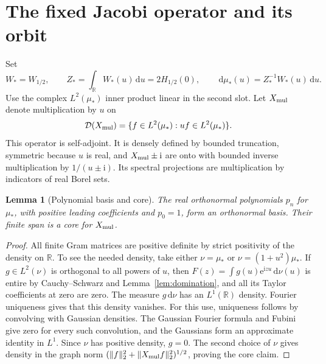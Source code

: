 \documentclass[11pt]{article}
\numberwithin{equation}{section}
\newtheorem{lemma}[theorem]{Lemma}
\newcommand{\R}{\mathbb R}
\newcommand{\ee}{\mathrm e}
\newcommand{\ii}{\mathrm i}
\newcommand{\dd}{\,\mathrm d}
\begin{document}
\section{The fixed Jacobi operator and its orbit}\label{sec:operator}

Set
\[
 W_*=W_{1/2},\qquad Z_*=\int_{\R}W_*(u)\dd u=2H_{1/2}(0),
 \qquad \dd\mu_*(u)=Z_*^{-1}W_*(u)\dd u.
\]
Use the complex \(L^2(\mu_*)\) inner product linear in the second
slot. Let \(X_{\rm mul}\) denote multiplication by \(u\) on
\[
 \mathcal D(X_{\rm mul})=\{f\in L^2(\mu_*):uf\in L^2(\mu_*)\}.
\]
This operator is self-adjoint. It is densely defined by bounded
truncation, symmetric because \(u\) is real, and
\(X_{\rm mul}\pm\ii\) are onto with bounded inverse multiplication by
\(1/(u\pm\ii)\). Its spectral projections are multiplication by
indicators of real Borel sets.

\begin{lemma}[Polynomial basis and core]\label{lem:core}
The real orthonormal polynomials \(p_n\) for \(\mu_*\), with positive
leading coefficients and \(p_0=1\), form an orthonormal basis. Their
finite span is a core for \(X_{\rm mul}\).
\end{lemma}
\begin{proof}
All finite Gram matrices are positive definite by strict positivity
of the density on \(\R\). To see the needed density, take either
\(\nu=\mu_*\) or \(\nu=(1+u^2)\mu_*\). If \(g\in L^2(\nu)\) is
orthogonal to all powers of \(u\), then
\(F(z)=\int g(u)\ee^{\ii zu}\dd\nu(u)\) is entire by
Cauchy--Schwarz and Lemma~\ref{lem:domination}, and all its Taylor
coefficients at zero are zero. The measure \(g\dd\nu\) has an
\(L^1(\R)\) density. Fourier uniqueness gives that this density
vanishes. For this use, uniqueness follows by convolving with
Gaussian densities. The Gaussian Fourier formula and Fubini give
zero for every such convolution, and the Gaussians form an
approximate identity in \(L^1\). Since \(\nu\) has positive density,
\(g=0\). The second choice of \(\nu\) gives density in the graph
norm \((\|f\|_2^2+\|X_{\rm mul}f\|_2^2)^{1/2}\), proving the core
claim.
\end{proof}
\end{document}
